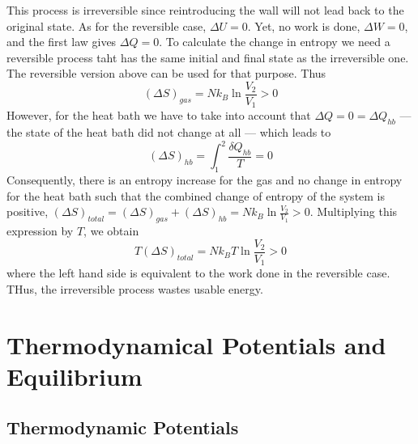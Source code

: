 \documentclass[12pt, a4paper, oneside, openright, titlepage]{book}
\begin{document}
This process is irreversible since reintroducing the wall will not lead back to the original state. As for the reversible case, $\Delta U = 0$. Yet, no work is done, $\Delta W = 0$, and the first law gives $\Delta Q = 0$. To calculate the change in entropy we need a reversible process taht has the same initial and final state as the irreversible one. The reversible version above can be used for that purpose. Thus \begin{equation*}
    (\Delta S)_{gas} = Nk_B\ln\frac{V_2}{V_1} > 0
\end{equation*}
However, for the heat bath we have to take into account that $\Delta Q = 0 = \Delta Q_{hb}$ --- the state of the heat bath did not change at all --- which leads to \begin{equation*}
    (\Delta S)_{hb} = \int_1^2\frac{\delta Q_{hb}}{T} = 0
\end{equation*}
Consequently, there is an entropy increase for the gas and no change in entropy for the heat bath such that the combined change of entropy of the system is positive, $(\Delta S)_{total} = (\Delta S)_{gas} + (\Delta S)_{hb} = Nk_B\ln\frac{V_2}{V_1} > 0$. Multiplying this expression by $T$, we obtain \begin{equation*}
    T(\Delta S)_{total} = Nk_BT\ln\frac{V_2}{V_1} > 0
\end{equation*}
where the left hand side is equivalent to the work done in the reversible case. THus, the irreversible process wastes usable energy.



\chapter{Thermodynamical Potentials and Equilibrium}



\section{Thermodynamic Potentials}
\end{document}
